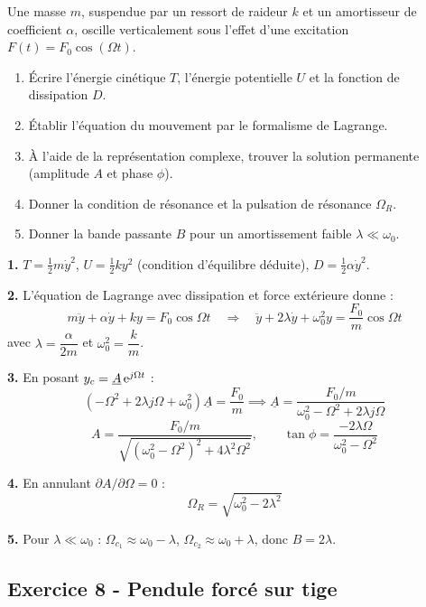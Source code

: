 \documentclass[12pt,a4paper]{article}
\begin{document}
\begin{boiteexercice}
Une masse $m$, suspendue par un ressort de raideur $k$ et un amortisseur de coefficient $\alpha$, oscille verticalement sous l'effet d'une excitation $F(t) = F_0\cos(\Omega t)$.
\begin{enumerate}
  \item Écrire l'énergie cinétique $T$, l'énergie potentielle $U$ et la fonction de dissipation $D$.
  \item Établir l'équation du mouvement par le formalisme de Lagrange.
  \item À l'aide de la représentation complexe, trouver la solution permanente (amplitude $A$ et phase $\phi$).
  \item Donner la condition de résonance et la pulsation de résonance $\Omega_R$.
  \item Donner la bande passante $B$ pour un amortissement faible $\lambda \ll \omega_0$.
\end{enumerate}
\end{boiteexercice}

\begin{boitecorrige}
\textbf{1.} $T = \frac{1}{2}m\dot{y}^2$, $U = \frac{1}{2}ky^2$ (condition d'équilibre déduite), $D = \frac{1}{2}\alpha\dot{y}^2$.

\textbf{2.} L'équation de Lagrange avec dissipation et force extérieure donne :
\[
m\ddot{y} + \alpha\dot{y} + ky = F_0\cos\Omega t \quad\Longrightarrow\quad \ddot{y} + 2\lambda\dot{y} + \omega_0^2 y = \frac{F_0}{m}\cos\Omega t
\]
avec $\lambda = \dfrac{\alpha}{2m}$ et $\omega_0^2 = \dfrac{k}{m}$.

\textbf{3.} En posant $y_c = \underline{A}\,\mathrm{e}^{j\Omega t}$ :
\[
(-\Omega^2 + 2\lambda j\Omega + \omega_0^2)\underline{A} = \frac{F_0}{m} \implies \underline{A} = \frac{F_0/m}{\omega_0^2 - \Omega^2 + 2\lambda j\Omega}
\]
\[
A = \frac{F_0/m}{\sqrt{(\omega_0^2-\Omega^2)^2 + 4\lambda^2\Omega^2}}, \qquad \tan\phi = \frac{-2\lambda\Omega}{\omega_0^2-\Omega^2}
\]

\textbf{4.} En annulant $\partial A/\partial\Omega = 0$ :
\[
\Omega_R = \sqrt{\omega_0^2 - 2\lambda^2}
\]

\textbf{5.} Pour $\lambda \ll \omega_0$ : $\Omega_{c_1} \approx \omega_0 - \lambda$, $\Omega_{c_2} \approx \omega_0 + \lambda$, donc $B = 2\lambda$.
\end{boitecorrige}

\subsection*{Exercice 8 - Pendule forcé sur tige \niveau{\difficile}}
\end{document}

